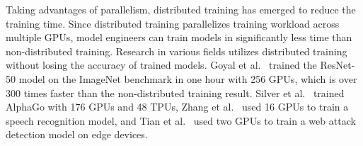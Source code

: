 Taking advantages of parallelism, distributed training has emerged to reduce
the training time. 
Since distributed training parallelizes training workload across multiple GPUs,
model engineers can train models in significantly less time than
non-distributed training.
Research in various fields utilizes distributed training without losing
the accuracy of trained models.
Goyal et al.~\cite{goyal2017accurate} trained the ResNet-50 model on the ImageNet
benchmark in one hour with 256 GPUs, which is over 300 times faster than the
non-distributed training result.
Silver et al.~\cite{Silver2017alphagozero} trained AlphaGo with 176
GPUs and 48 TPUs, Zhang et al.~\cite{zhang2019distributed} used 16 GPUs to train
a speech recognition model, and Tian et al.~\cite{tian2019distributed} used
two GPUs to train a web attack detection model on edge devices.




